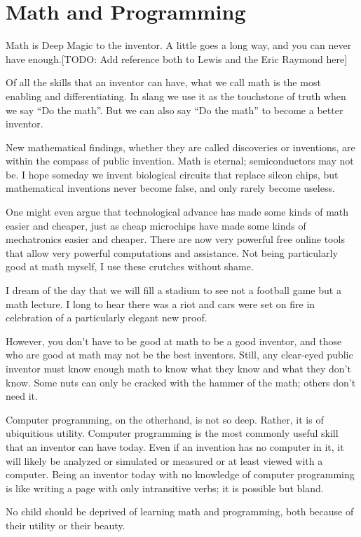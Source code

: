\documentclass[
	fontsize=10pt, %
	twoside=false, %
	secnumdepth=1, %
]{kaobook}
\begin{document}
\chapter{Math and Programming}

Math is Deep Magic to the inventor. A little goes a long way,
and you can never have enough.[TODO: Add reference both to Lewis and the Eric Raymond here]

Of all the skills that an inventor can have, what we call math
is the most enabling and differentiating. In slang we use
it as the touchstone of truth when we say ``Do the math''.
But we can also say ``Do the math'' to become a better inventor.

New mathematical findings, whether they are called
discoveries or inventions, are within the compass of public invention.
Math is eternal; semiconductors may not be. I hope someday we invent
biological circuits that replace silcon chips, but mathematical inventions
never become false, and only rarely become useless.

One might even argue that technological advance has made some kinds
of math easier and cheaper, just as cheap microchips have made some kinds of
mechatronics easier and cheaper. There are now very powerful free online tools
that allow very powerful computations and assistance.
Not being particularly good at math myself, I use these crutches without shame.

I dream of the day that we will fill a stadium to see not
a football game but a math lecture. I long to hear there was a riot and
cars were set on fire in celebration of a particularly elegant new proof.

However, you don't have to be good at math to be a good inventor, and
those who are good at math may not be the best inventors. Still,
any clear-eyed public inventor must know enough math to know what
they know and what they don't know. Some nuts can only be cracked
with the hammer of the math; others don't need it.

Computer programming, on the otherhand, is not so deep.
Rather, it is of ubiquitious utility. Computer programming
is the most commonly useful skill that an inventor can have today.
Even if an invention has no computer in it, it will likely be
analyzed or simulated or measured or at least viewed with a
computer. Being an inventor today with no knowledge of computer
programming is like writing a page with only intransitive verbs;
it is possible but bland.

No child should be deprived of learning math and programming,
both because of their utility or their beauty.
\end{document}
